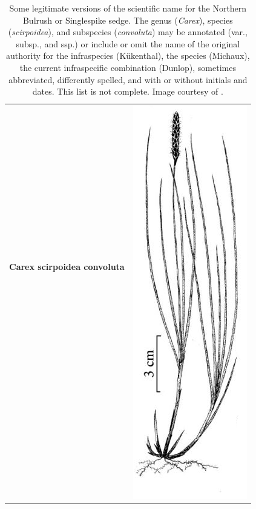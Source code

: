 \documentclass{bmcart}
\begin{document}
\begin{table}[!htb]
  \begin{center}

  \caption{Some legitimate versions of the scientific name for the Northern
    Bulrush or Singlespike sedge.  The genus (\textit{Carex}), species
    (\textit{scirpoidea}), and subspecies (\textit{convoluta}) may be annotated
    (var., subsp., and ssp.) or include or omit the name of the original authority for the
    infraspecies (Kükenthal), the species (Michaux), the current infraspecific
    combination (Dunlop), sometimes abbreviated, differently spelled, and with
    or without initials and dates. This list is not complete.  Image courtesy of \cite{FNA2002}.}\label{table:carex}

    \begin{tabular}{| l | c |}
    \hline
    \textbf{Carex scirpoidea convoluta} &
    \multirow{26}{*}{\includegraphics[scale=0.3]{images/carex.png}} \\
    & \\

\end{tabular}
\end{center}
\end{table}
\end{document}
